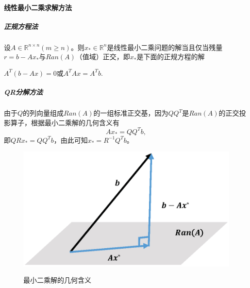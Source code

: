 \documentclass[UTF8]{article}
\begin{document}
\begin{flushleft}
\paragraph{\textcolor[rgb]{0.00,0.07,1.00}{线性最小二乘求解方法}}
\subparagraph{正规方程法}
设$A\in\mathbb{R}^{n \times n}(m \geq n)$。则$x_*\in\mathbb{R}^n$是线性最小二乘问题的解当且仅当残量$r=b-Ax_*$与$Ran(A)$（值域）正交，即$x_*$是下面的\textcolor[rgb]{0.00,0.07,1.00}{正规方程}的解
\begin{center}
$A^T(b-Ax)=0$或$A^TAx=A^Tb.$
\end{center}
\subparagraph{QR分解方法}
由于$Q$的列向量组成$Ran(A)$的一组标准正交基，因为$QQ^T$是$Ran(A)$的正交投影算子，根据最小二乘解的几何含义有
$$Ax_*=QQ^Tb,$$
即$QRx_*=QQ^Tb$，由此可知$x_*=R^{-1}Q^{T}b$。
\begin{figure}[!hbt]
  \centering
  \includegraphics[width=13cm]{images/LSM.eps}\\
  \caption{最小二乘解的几何含义}\label{图:LSM}
\end{figure}

\end{flushleft}
\end{document}
